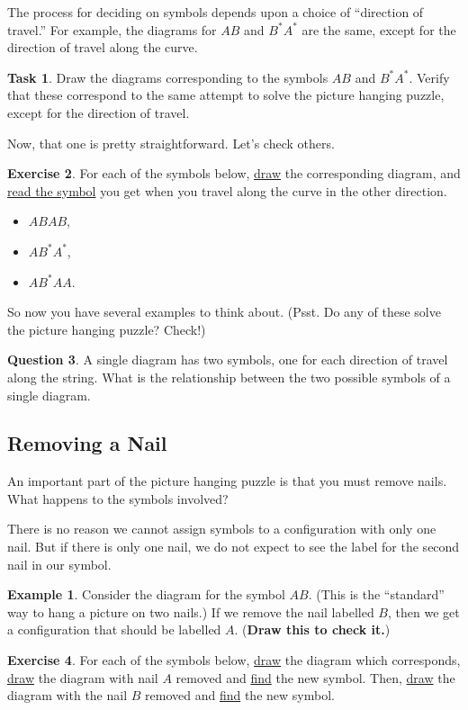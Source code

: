 \documentclass[12pt,letterpaper]{article}
\theoremstyle{definition}
\newtheorem{question}{Question}
\newtheorem{example}{Example}
\newtheorem{exercise}[question]{Exercise}
\newtheorem{task}[question]{Task}
\begin{document}
The process for deciding on symbols depends upon a choice of ``direction of travel.''
For example, the diagrams for $AB$ and $B^*A^*$ are the same, except for the direction of travel along the curve.
\begin{task}
Draw the diagrams corresponding to the symbols $AB$ and $B^*A^*$. Verify that these correspond to the same attempt to solve the picture hanging puzzle, except for the  direction of travel.
\end{task}
Now, that one is pretty straightforward.
Let's check others.
\begin{exercise}
For each of the symbols below, \underline{draw} the corresponding diagram, and \underline{read the symbol} you get when you travel along the curve in the other direction.
\begin{itemize}
\item $ABAB$,
\item $AB^*A^*$,
\item $AB^*AA$.
\end{itemize}
\end{exercise}
So now you have several examples to think about.
(Psst. Do any of these solve the picture hanging puzzle? Check!)

\begin{question}
A single diagram has two symbols, one for each direction of travel along the string.
What is the relationship between the two possible symbols of a single diagram.
\end{question}

\subsection*{Removing a Nail}

An important part of the picture hanging puzzle is that you must remove nails.
What happens to the symbols involved?

There is no reason we cannot assign symbols to a configuration with only one nail. But if there is only one nail, we do not expect to see the label for the second nail in our symbol.
\begin{example}
Consider the diagram for the symbol $AB$.
(This is the ``standard'' way to hang a picture on two nails.)
If we remove the nail labelled $B$, then we get a configuration that should be labelled $A$.
(\textbf{Draw this to check it.})
\end{example}

\begin{exercise}
For each of the symbols below, \underline{draw} the diagram which corresponds, \underline{draw} the diagram with nail $A$ removed and \underline{find} the new symbol.
Then, \underline{draw} the diagram with the nail $B$ removed and \underline{find} the new symbol.
\end{exercise}
\end{document}
